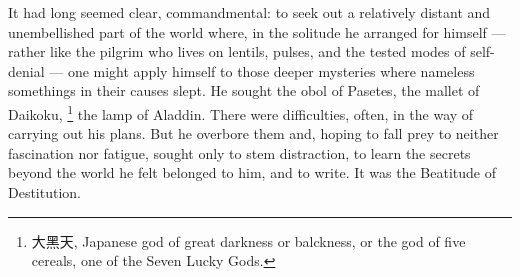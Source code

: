  It had long seemed clear, commandmental: to seek out a relatively distant and
unembellished 
part of the world where, in the solitude he arranged for
himself ---rather like the pilgrim who lives on lentils, 
pulses, 
and the tested modes of self-denial --- one might apply himself to those deeper 
mysteries where nameless somethings in their causes slept. He sought the obol 
of Pasetes, the mallet 
of Daikoku, 
\footnote{大黑天, Japanese god of great darkness or balckness, or the god of 
five cereals, one of the Seven Lucky Gods.}
the lamp of Aladdin. There were difficulties, often, in the
way of carrying out his plans. But he overbore them and, hoping to fall prey to
neither fascination nor fatigue, sought only to stem distraction, to learn the
secrets beyond the world he felt belonged to him, and to write. It was the
Beatitude 
of Destitution.

